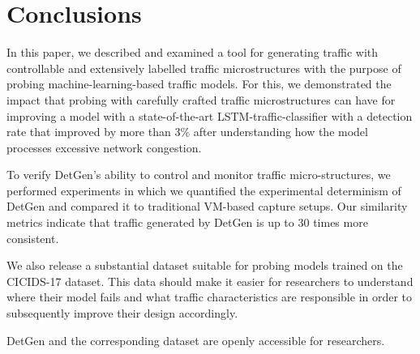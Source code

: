 \documentclass[runningheads]{llncs}
\begin{document}





\section{Conclusions}\label{Sec:Conclusion}

In this paper, we described and examined a tool for generating traffic with controllable and extensively labelled traffic microstructures with the purpose of probing machine-learning-based traffic models. For this, we demonstrated the impact that probing with carefully crafted traffic microstructures can have for improving a model with a state-of-the-art LSTM-traffic-classifier with a detection rate that improved by more than 3\% after understanding how the model processes excessive network congestion. 

To verify DetGen's ability to control and monitor traffic micro-structures, we performed experiments in which we quantified the experimental determinism of DetGen and compared it to traditional VM-based capture setups. Our similarity metrics indicate that traffic generated by DetGen is up to 30 times more consistent.

We also release a substantial dataset suitable for probing models trained on the CICIDS-17 dataset. This data should make it easier for researchers to understand where their model fails and what traffic characteristics are responsible in order to subsequently improve their design accordingly.

DetGen and the corresponding dataset are openly accessible for researchers.


\end{document}
